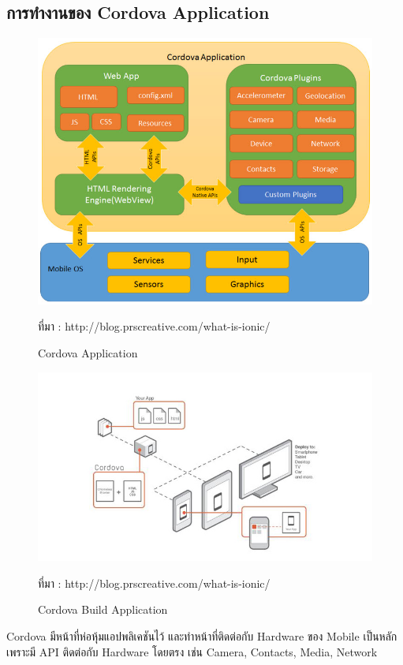 		\subsection{การทำงานของ Cordova Application}
		\begin{figure}[H]
			\centering
			\includegraphics[width=0.8\columnwidth]{Figures/2/ionic2}
			\caption{Cordova Application}{ที่มา : http://blog.prscreative.com/what-is-ionic/}
			\label{Fig:ionic1}
		\end{figure}
		\begin{figure}[H]
			\centering
			\includegraphics[width=0.8\columnwidth]{Figures/2/ionic3}
			\caption{Cordova Build Application}{ที่มา : http://blog.prscreative.com/what-is-ionic/}
			\label{Fig:ionic2}
		\end{figure}

		\item Cordova มีหน้าที่ห่อหุ้มแอปพลิเคชันไว้ และทำหน้าที่ติดต่อกับ Hardware ของ Mobile เป็นหลักเพราะมี API ติดต่อกับ Hardware โดยตรง เช่น Camera, Contacts, Media, Network
		
